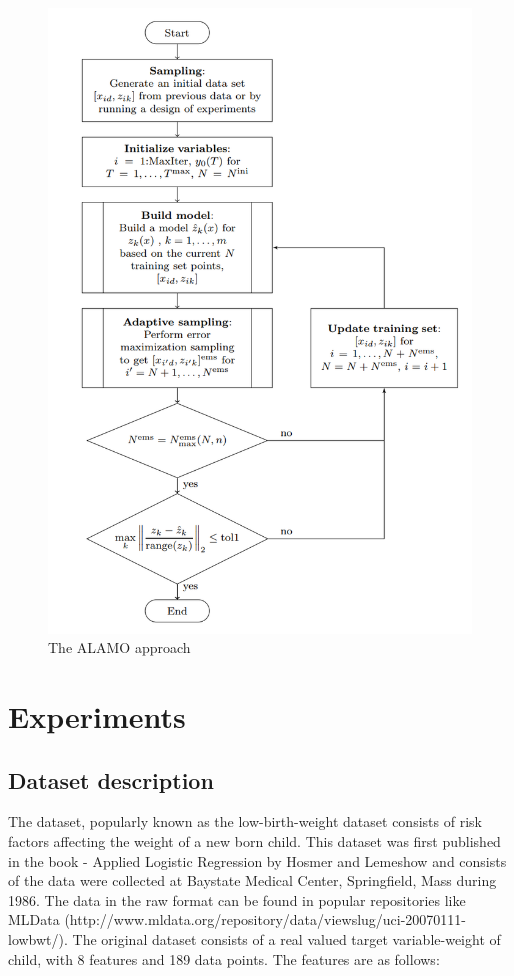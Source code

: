 \documentclass[a4paper,12pt]{article}
\begin{document}
\begin{figure}[H]
 \centering
 \includegraphics[scale=0.4]{flowchart-alamo.png}
 \caption{The ALAMO approach}
  \label{fig:ALAMO Flowchart}
\end{figure}

\newpage
\section{Experiments}
	\subsection{Dataset description}
		The dataset, popularly known as the low-birth-weight dataset consists of risk factors affecting the weight of a new born child. This dataset was first published in the book - Applied Logistic Regression by Hosmer and Lemeshow \cite{hosmer2013applied} and consists of the  data were collected at Baystate Medical Center, Springfield, Mass during 1986. The data in the raw format can be found in popular repositories like MLData (http://www.mldata.org/repository/data/viewslug/uci-20070111-lowbwt/). The original dataset consists of a real valued target variable-weight of child, with 8 features and 189 data points. The features are as follows:
    
\end{document}
